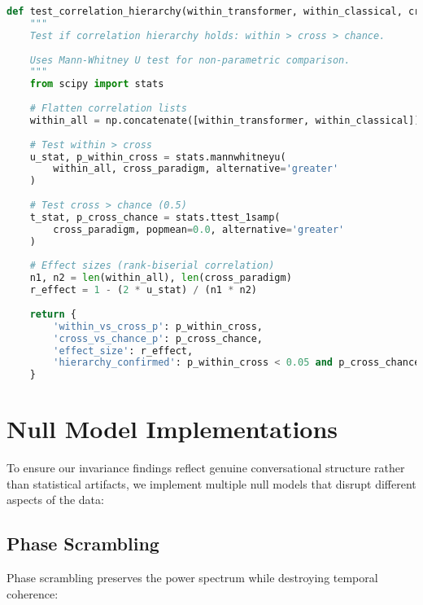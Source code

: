 \documentclass[11pt,letterpaper]{article}
\begin{document}
\begin{lstlisting}[language=Python]
def test_correlation_hierarchy(within_transformer, within_classical, cross_paradigm):
    """
    Test if correlation hierarchy holds: within > cross > chance.
    
    Uses Mann-Whitney U test for non-parametric comparison.
    """
    from scipy import stats
    
    # Flatten correlation lists
    within_all = np.concatenate([within_transformer, within_classical])
    
    # Test within > cross
    u_stat, p_within_cross = stats.mannwhitneyu(
        within_all, cross_paradigm, alternative='greater'
    )
    
    # Test cross > chance (0.5)
    t_stat, p_cross_chance = stats.ttest_1samp(
        cross_paradigm, popmean=0.0, alternative='greater'
    )
    
    # Effect sizes (rank-biserial correlation)
    n1, n2 = len(within_all), len(cross_paradigm)
    r_effect = 1 - (2 * u_stat) / (n1 * n2)
    
    return {
        'within_vs_cross_p': p_within_cross,
        'cross_vs_chance_p': p_cross_chance,
        'effect_size': r_effect,
        'hierarchy_confirmed': p_within_cross < 0.05 and p_cross_chance < 0.05
    }
\end{lstlisting}

\section{Null Model Implementations}
\label{app:null-models}

To ensure our invariance findings reflect genuine conversational structure rather than statistical artifacts, we implement multiple null models that disrupt different aspects of the data:

\subsection{Phase Scrambling}

Phase scrambling preserves the power spectrum while destroying temporal coherence:
\end{document}
